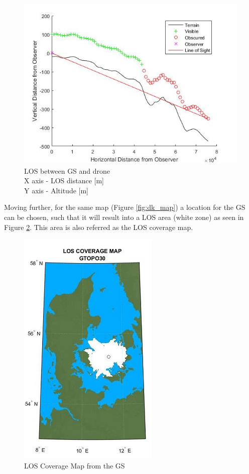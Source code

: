 \begin{figure}[h]
	\centering
	\includegraphics[scale=0.75]{figures/los_2p.jpg}
	\caption{LOS between GS and drone \\ X axis - LOS distance [m] \\ Y axis - Altitude [m]}
   	\label{fig:los_2p}
\end{figure}

Moving further, for the same map (Figure \ref{fig:dk_map}) a location for the GS can be chosen, such that it will result into a LOS area (white zone) as seen in Figure \ref{fig:los_area}. This area is also referred as the LOS coverage map.

\begin{figure}[h]
	\centering
	\includegraphics[scale=2.5]{figures/coverage_map.jpg}
	\caption{LOS Coverage Map from the GS}
   	\label{fig:los_area}
\end{figure}

